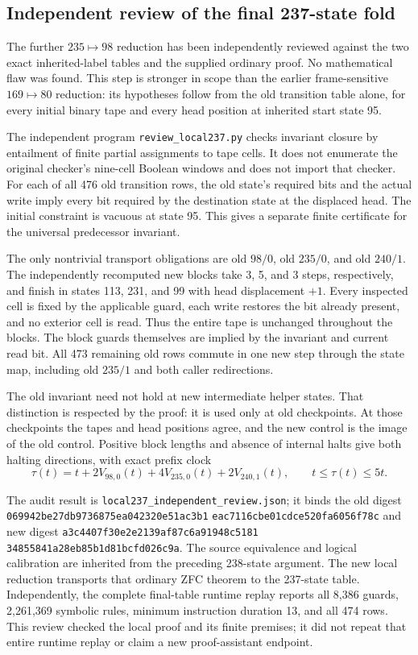 \subsection{Independent review of the final 237-state fold}

The further $235\mapsto98$ reduction has been independently reviewed
against the two exact inherited-label tables and the supplied ordinary
proof.  No mathematical flaw was found.  This step is stronger in scope
than the earlier frame-sensitive $169\mapsto80$ reduction: its hypotheses
follow from the old transition table alone, for every initial binary tape
and every head position at inherited start state 95.

The independent program \texttt{review\_local237.py} checks invariant
closure by entailment of finite partial assignments to tape cells.  It
does not enumerate the original checker's nine-cell Boolean windows and
does not import that checker.  For each of all 476 old transition rows,
the old state's required bits and the actual write imply every bit
required by the destination state at the displaced head.  The initial
constraint is vacuous at state 95.  This gives a separate finite
certificate for the universal predecessor invariant.

The only nontrivial transport obligations are old $98/0$, old $235/0$,
and old $240/1$.  The independently recomputed new blocks take 3, 5,
and 3 steps, respectively, and finish in states 113, 231, and 99 with
head displacement $+1$.  Every inspected cell is fixed by the applicable
guard, each write restores the bit already present, and no exterior cell
is read.  Thus the entire tape is unchanged throughout the blocks.
The block guards themselves are implied by the invariant and current
read bit.  All 473 remaining old rows commute in one new step through
the state map, including old $235/1$ and both caller redirections.

The old invariant need not hold at new intermediate helper states.
That distinction is respected by the proof: it is used only at old
checkpoints.  At those checkpoints the tapes and head positions agree,
and the new control is the image of the old control.  Positive block
lengths and absence of internal halts give both halting directions,
with exact prefix clock
\[
 \tau(t)=t+2V_{98,0}(t)+4V_{235,0}(t)+2V_{240,1}(t),
 \qquad t\leq\tau(t)\leq5t.
\]

The audit result is
\texttt{local237\_independent\_review.json}; it binds the old digest
\texttt{069942be27db9736875ea042320e51ac3b1}\allowbreak
\texttt{eac7116cbe01cdce520fa6056f78c}
and new digest
\texttt{a3c4407f30e2e2139af87c6a91948c5181}\allowbreak
\texttt{34855841a28eb85b1d81bcfd026c9a}.
The source equivalence and logical calibration are inherited from the
preceding 238-state argument.  The new local reduction transports that
ordinary ZFC theorem to the 237-state table.  Independently, the complete
final-table runtime replay reports all 8,386 guards, 2,261,369 symbolic
rules, minimum instruction duration 13, and all 474 rows.  This review
checked the local proof and its finite premises; it did not repeat that
entire runtime replay or claim a new proof-assistant endpoint.
